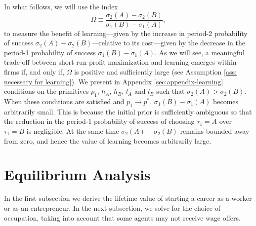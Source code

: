 \documentclass[12pt,american]{paper}
\theoremstyle{remark}
\begin{document}
In what follows, we will use the index
\[
\Omega \equiv \frac{\sigma_2(A)-\sigma_2(B)}{\sigma_1(B)-\sigma_1(A)},
\]
to measure the benefit of learning---given by the increase in period-2 probability of success $\sigma_2(A)-\sigma_2(B)$---relative to its cost---given by the decrease in the period-1 probability of success $\sigma_1(B)-\sigma_1(A)$. As we will see, a meaningful trade-off between short run profit maximization and learning emerges within firms if, and only if, $\Omega$ is positive and sufficiently large (see Assumption \ref{ass: necessary for learning}). We present in Appendix  \ref{sec:appendix-learning}  conditions on the primitives $p_1$, $h_A$, $h_B$, $l_A$ and $l_B$ such that $\sigma_2(A)>\sigma_2(B)$. When these conditions are satisfied and $p_1\rightarrow p^*$,  $\sigma_1(B)-\sigma_1(A)$ becomes arbitrarily small. This is because the initial prior is sufficiently ambiguous so that the reduction in the period-1 probability of success of choosing $\tau_1=A$ over $\tau_1=B$ is negligible. At the same time $\sigma_2(A)-\sigma_2(B)$ remains bounded away from zero, and hence the value of learning becomes arbitrarily large.














\section{Equilibrium Analysis}\label{sec:equilibrium}
In the first subsection we derive the lifetime value of starting a career as a worker or as an entrepreneur.  In the next subsection, we solve for the choice of occupation, taking into account that some agents may not receive wage offers.
\end{document}
